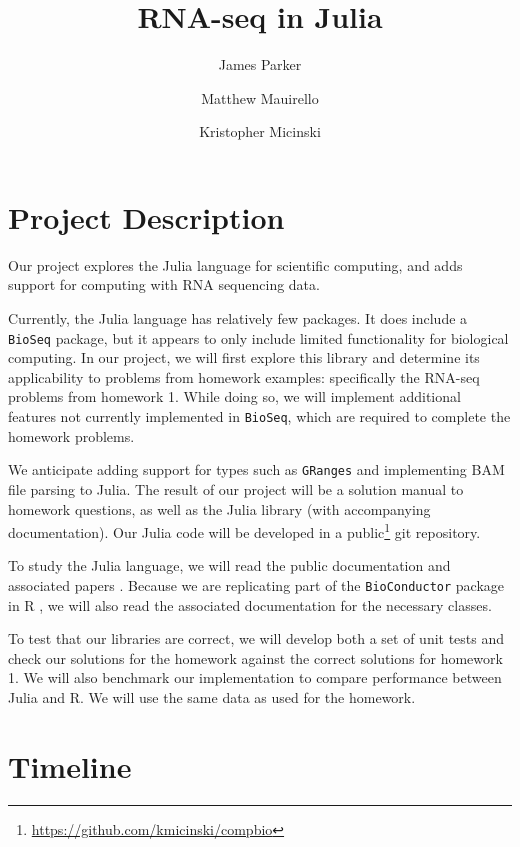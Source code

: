 \documentclass[10pt]{article}
\title{RNA-seq in Julia}
\author{James Parker}
\author{Matthew Mauirello}
\author{Kristopher Micinski}
\begin{document}
\maketitle

\section{Project Description}

Our project explores the Julia language for scientific computing, and
adds support for computing with RNA sequencing data.

Currently, the Julia language has relatively few packages.  It does
include a \texttt{BioSeq} \cite{bioseq} package, but it appears to
only include limited functionality for biological computing.  In our
project, we will first explore this library and determine its
applicability to problems from homework examples: specifically the
RNA-seq problems from homework 1.  While doing so, we will implement
additional features not currently implemented in \texttt{BioSeq}, which
are required to complete the homework problems.

We anticipate adding support for types such as \texttt{GRanges} and
implementing BAM file parsing to Julia.  The result of our project will be a
solution manual to homework questions, as well as the Julia library
(with accompanying documentation).  Our Julia code will be developed
in a public\footnote{\url{https://github.com/kmicinski/compbio}} git
repository.

To study the Julia language, we will read the public documentation and
associated papers \cite{juliapaper}.  Because we are replicating part
of the \texttt{BioConductor} package in R \cite{bioconductor}, we will
also read the associated documentation for the necessary classes.

To test that our libraries are correct, we will develop both a set of
unit tests and check our solutions for the homework against the
correct solutions for homework 1.  We will also benchmark our 
implementation to compare performance between Julia and R. 
We will use the same data as used for the homework.

\section{Timeline}
\end{document}
